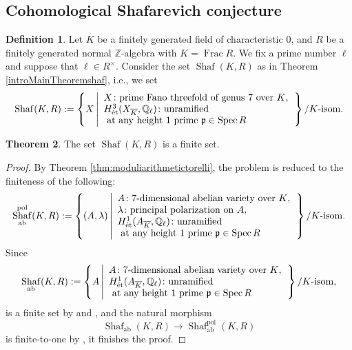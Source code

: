 \documentclass[autodetect-engine, a4paper]{amsart}
\theoremstyle{definition}
\newtheorem{thm}{Theorem}[section]
\newtheorem{defn}[thm]{Definition}
\def\Q{{\mathbb Q}}
\def\Z{{\mathbb Z}}
\DeclareMathOperator\Frac{\mathrm{Frac}}
\DeclareMathOperator\Spec{\mathrm{Spec}}
\DeclareMathOperator\Shaf{\mathrm{Shaf}}
\def\et{\mathop{\text{\rm \'et}}}
\begin{document}
\subsection{Cohomological Shafarevich conjecture}
\begin{defn}
\label{defn:shafKR}
Let $K$ be a finitely generated field of characteristic $0$,
and $R$ be a finitely generated normal $\Z$-algebra
with $K = \Frac R$. We fix a prime number $\ell$ and suppose that $\ell \in R^{\times}$.
Consider the set $\Shaf(K,R)$
as in Theorem \ref{introMainTheoremshaf}, i.e., we set
\[
\Shaf(K,R) :=
\left\{X   \left| 
\begin {array}{l}
X \colon \textup{prime Fano threefold of genus 7 over $K$}, \\
H^3_{\et}(X_{\overline{K}}, \Q_{\ell}) \colon \textup{unramified}\\
\textup{ at any height $1$ prime } \mathfrak{p} \in \Spec R
\end{array}
\right.
\right\}/K\textup{-isom}.
\]
\end{defn}

\begin{thm}
\label{thm:cohomshaf}
The set $\Shaf (K,R)$ is a finite set.
\end{thm}

\begin{proof}
By Theorem \ref{thm:moduliarithmetictorelli}, the problem is reduced to the finiteness of the following:
\[
\Shaf_{\mathrm{ab}}^{\mathrm{pol}}(K,R)
 :=
\left\{(A,\lambda)   \left| 
\begin {array}{l}
A \colon \textup{$7$-dimensional abelian variety over $K$}, \\
\lambda \colon \textup{principal polarization on $A$},\\
H^1_{\et}(A_{\overline{K}}, \Q_{\ell}) \colon \textup{unramified}\\
\textup{ at any height $1$ prime } \mathfrak{p} \in \Spec R
\end{array}
\right.
\right\}/K\textup{-isom}.
\]
Since 
\[
\Shaf_{\mathrm{ab}}(K,R)
:= \left\{A   \left| 
\begin {array}{l}
A \colon \textup{$7$-dimensional abelian variety over $K$}, \\
H^1_{\et}(A_{\overline{K}}, \Q_{\ell}) \colon \textup{unramified}\\
\textup{ at any height $1$ prime } \mathfrak{p} \in \Spec R
\end{array}
\right.
\right\}/K\textup{-isom},
\]
is a finite set by \cite[Chapter VI, Theorem 2]{Faltings-Wuestholz} and \cite{Martin-Deschamps}, and the natural morphism
\[
\Shaf_{\mathrm{ab}}(K,R) \rightarrow \Shaf_{\mathrm{ab}}^{\mathrm{pol}}(K,R)\]
is finite-to-one by \cite[Theorem 18.1]{Milne}, it finishes the proof.
\end{proof}
\end{document}
